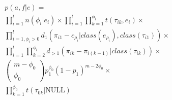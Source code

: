 \begin{eqnarray*}
 & p\left(a,f|e\right)=\\
 & \prod_{i=1}^{l}n\left(\phi_{i}|e_{i}\right)\times\prod_{i=1}^{l}\prod_{k=1}^{\phi_{i}}t\left(\tau_{ik},e_{i}\right)\times\\
 & \prod_{i=1,\phi_{i}>0}^{l}d_{1}\left(\pi_{i1}-c_{\rho_{i}}|class\left(e_{\rho_{i}}\right),class\left(\tau_{i1}\right)\right)\times\\
 & \prod_{i=1}^{l}\prod_{k=2}^{\phi_{i}}d_{>1}\left(\pi_{ik}-\pi_{i\left(k-1\right)}|class\left(\tau_{ik}\right)\right)\times\\
 & \left(\begin{array}{c}
m-\phi_{0}\\
\phi_{0}\end{array}\right)p_{1}^{\phi_{0}}\left(1-p_{1}\right)^{m-2\phi_{0}}\times\\
 & \prod_{k=1}^{\phi_{0}}t\left(\tau_{0k}|\text{NULL}\right)\end{eqnarray*}
